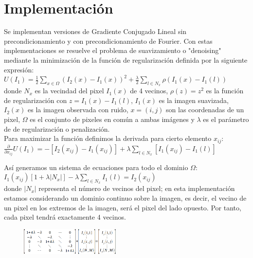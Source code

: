 \documentclass[10pt,journal,compsoc]{styles/IEEEtran}
\begin{document}
\section{Implementaci\'on}

Se implementan versiones de Gradiente Conjugado Lineal sin precondicionamiento y con precondicionamiento de Fourier. Con estas implementaciones se resuelve el problema de suavizamiento o "denoising" mediante la minimización de la función de regularizaci\'on definida por la siguiente expresión:\\

$U(I_1)=\frac{1}{2} \sum\limits_{x \in \Omega} (I_2(x)-I_1(x))^2+\frac{\lambda}{2} \sum\limits_{l \in N_x} \rho (I_1(x)-I_1(l))$\\

donde $N_x$ es la vecindad del pixel $I_1(x)$ de 4 vecinos, $\rho(z)=z^2$ es la función de regularizaci\'on con $z= I_1(x)-I_1(l)$, $I_1(x)$ es la imagen suavizada, $I_2(x)$ es la imagen observada con ruido, $x=(i,j)$ son las coordenadas de un pixel, $\Omega$ es el conjunto de pixeles en común a ambas imágenes y $\lambda$ es el parámetro de de regularizaci\'on o penalización.\\

Para maximizar la función definimos la derivada para cierto elemento $x_{ij}$:\\
 
$\frac{\partial}{\partial x_{ij}} U(I_1)=-[I_2(x_{ij})-I_1(x_{ij})]+\lambda \sum\limits_{l \in N_x} [I_1(x_{ij})-I_1(l)]$

Así generamos un sistema de ecuaciones para todo el dominio $\Omega$:\\

$I_1(x_{ij})[1+\lambda |N_x|]-\lambda \sum\limits_{l \in N_x} I_1(l)=I_2(x_{ij})$\\

donde $|N_x|$ representa el n\'umero de vecinos del pixel; en esta implementación estamos considerando un dominio continuo sobre la imagen, es decir, el vecino de un pixel en los extremos de la imagen, ser\'a el pixel del lado opuesto. Por tanto, cada pixel tendrá exactamente 4 vecinos.\\

\begin{figure}[hbtp]
\centering
\includegraphics[width=0.45\textwidth]{system.png}
\caption*{}
\end{figure}
\end{document}
